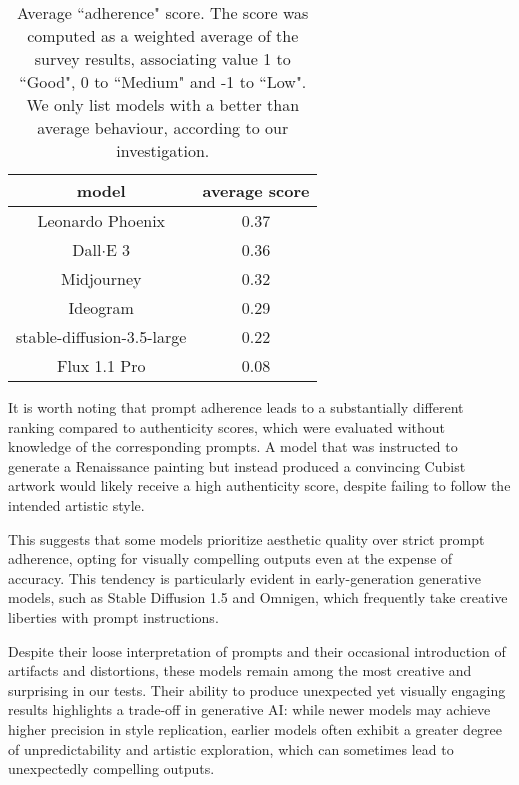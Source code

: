 \documentclass[sn-mathphys]{sn-jnl}
\begin{document}
\begin{table}[h]
    \centering
    \begin{tabular}{c|c}
    {\bf model} & {\bf average score}\\\hline\hline
  Leonardo Phoenix & 0.37 \\\hline
  Dall$\cdot$E 3 & 0.36\\\hline
  Midjourney & 0.32\\\hline
  Ideogram & 0.29 \\\hline
  stable-diffusion-3.5-large & 0.22 \\\hline
  Flux 1.1 Pro & 0.08 \\\hline
    \end{tabular}
    \caption{Average ``adherence" score. The score was computed as a weighted average of the survey results, associating value 1 to ``Good", 0 to ``Medium" and -1 to ``Low". We only list models with a better than average
    behaviour, according to our investigation.}
    \label{tab:adherence_scores}
\end{table}

It is worth noting that prompt adherence leads to a substantially different ranking compared to authenticity scores, which were evaluated without knowledge of the corresponding prompts. A model that was instructed to generate a Renaissance painting but instead produced a convincing Cubist artwork would likely receive a high authenticity score, despite failing to follow the intended artistic style.

This suggests that some models prioritize aesthetic quality over strict prompt adherence, opting for visually compelling outputs even at the expense of accuracy. This tendency is particularly evident in early-generation generative models, such as Stable Diffusion 1.5 and Omnigen, which frequently take creative liberties with prompt instructions.

Despite their loose interpretation of prompts and their occasional introduction of artifacts and distortions, these models remain among the most creative and surprising in our tests. Their ability to produce unexpected yet visually engaging results highlights a trade-off in generative AI: while newer models may achieve higher precision in style replication, earlier models often exhibit a greater degree of unpredictability and artistic exploration, which can sometimes lead to unexpectedly compelling outputs.
\end{document}
